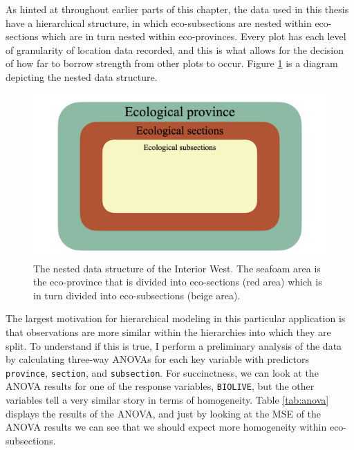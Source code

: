\documentclass[12pt,twoside]{reedthesis}
\begin{document}
As hinted at throughout earlier parts of this chapter, the data used in this thesis have a hierarchical structure, in which eco-subsections are nested within eco-sections which are in turn nested within eco-provinces. Every plot has each level of granularity of location data recorded, and this is what allows for the decision of how far to borrow strength from other plots to occur. Figure \ref{fig:data-structure} is a diagram depicting the nested data structure.
\begin{figure}

{\centering \includegraphics[width=1\linewidth]{figure/data-structure-new} 

}

\caption[The nested data structure of the Interior West]{The nested data structure of the Interior West. The seafoam area is the eco-province that is divided into eco-sections (red area) which is in turn divided into eco-subsections (beige area).}\label{fig:data-structure}
\end{figure}
The largest motivation for hierarchical modeling in this particular application is that observations are more similar within the hierarchies into which they are split. To understand if this is true, I perform a preliminary analysis of the data by calculating three-way ANOVAs for each key variable with predictors \texttt{province}, \texttt{section}, and \texttt{subsection}. For succinctness, we can look at the ANOVA results for one of the response variables, \texttt{BIOLIVE}, but the other variables tell a very similar story in terms of homogeneity. Table \ref{tab:anova} displays the results of the ANOVA, and just by looking at the MSE of the ANOVA results we can see that we should expect more homogeneity within eco-subsections.
\end{document}
